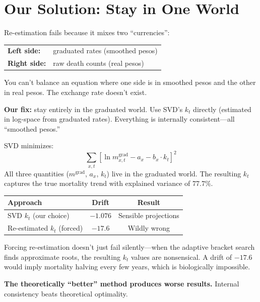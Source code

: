 \documentclass[11pt, a4paper]{article}
\newcommand{\ax}{a_x}
\newcommand{\bx}{b_x}
\newcommand{\kt}{k_t}
\begin{document}
\section{Our Solution: Stay in One World}

\begin{intuition}
Re-estimation fails because it mixes two ``currencies'':

\begin{center}
\begin{tabular}{ll}
\textbf{Left side:} & graduated rates (smoothed pesos) \\
\textbf{Right side:} & raw death counts (real pesos) \\
\end{tabular}
\end{center}

You can't balance an equation where one side is in smoothed pesos
and the other in real pesos. The exchange rate doesn't exist.

\medskip
\textbf{Our fix:} stay entirely in the graduated world.
Use SVD's $\kt$ directly (estimated in log-space from graduated rates).
Everything is internally consistent---all ``smoothed pesos.''
\end{intuition}

\begin{formaldef}[Why SVD $\kt$ Is Consistent]
SVD minimizes:
\[
\sum_{x,t} \left[\ln m_{x,t}^{\text{grad}} - \ax - \bx \cdot \kt \right]^2
\]
All three quantities ($m^{\text{grad}}$, $\ax$, $\kt$) live in the
graduated world. The resulting $\kt$ captures the true mortality trend
with explained variance of 77.7\%.
\end{formaldef}

\begin{application}
\begin{center}
\begin{tabular}{lcc}
\toprule
\textbf{Approach} & \textbf{Drift} & \textbf{Result} \\
\midrule
SVD $\kt$ (our choice) & $-1.076$ & Sensible projections \\
Re-estimated $\kt$ (forced) & $-17.6$ & Wildly wrong \\
\bottomrule
\end{tabular}
\end{center}

\medskip
Forcing re-estimation doesn't just fail silently---when the adaptive
bracket search finds approximate roots, the resulting $\kt$ values
are nonsensical. A drift of $-17.6$ would imply mortality halving
every few years, which is biologically impossible.

\medskip
\textbf{The theoretically ``better'' method produces worse results.}
Internal consistency beats theoretical optimality.
\end{application}
\end{document}
